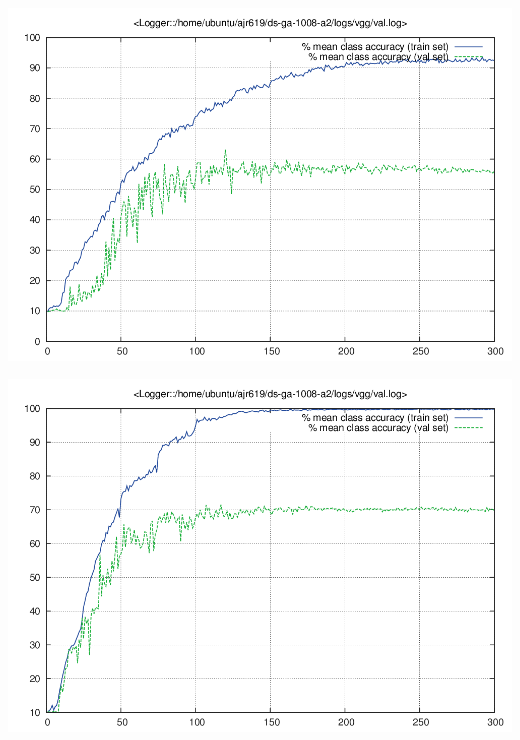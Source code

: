 \documentclass{article}
\begin{document}
\begin{centering}
\includegraphics[scale=0.3]{images/vggInDS-ga/val.png}
\end{centering}

\begin{centering}
\includegraphics[scale=0.3]{images/logs_default/val.png}
\end{centering}
\end{document}
